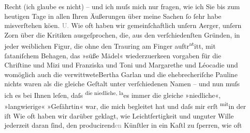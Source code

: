                Recht (ich glaube es nicht) – und ich muſs mich nur fragen, wie ich Sie bis zum
               heutigen Tage in allen Ihren Äußerungen über meine Sachen ſo ſehr habe misverſtehen
                  kö{\geminationn}en. \textcolor{gray}{U.} Wie oft haben wir
               gemeinſchaftlich unſern Aerger, unſern Zorn über die Kritiken ausgeſprochen, {\pb}die, aus den verſchiedenſten Gründen, in
               jeder weiblichen Figur, die ohne den Trauring am Finger auftr\substVorne{}\textsuperscript{at}\substDazwischen{}itt\substHinten{}, mit ſataniſchem Behagen, das »süße Mädel« wiederzuerke{\geminationn}en vorgaben {\dotsfour} für die Chriſtine und Mizi und Franziska und Toni und Margarethe und Léocadie und womöglich auch \introOben{}die verwittwete\introOben{}{ }Bertha Garlan und die
               ehebrecheriſche Pauline nichts
               waren als die gleiche Geſtalt unter verſchiedenen Na{\pb}men – und nun muſs ich es bei Ihnen \strikeout{\textcolor{gray}{wied}} leſen, daſs \substVorne{}\textsuperscript{die niedliche, la}\substDazwischen{}es\substHinten{} immer die gleiche »niedliche«, »langwierige« »Gefährtin« war, die mich
               begleitet hat und daſs  mir erſt \substVorne{}\textsuperscript{mit}\substDazwischen{}in\substHinten{} der \label{T_L02988-2v}\label{T_L02988-2} iſt{\dotstwo} Wie oft haben wir darüber geklagt, wie Leichtfertigkeit
               und unguter Wille jederzeit daran ſind, den producirend\textcolor{gray}{en}{ }{\pb}Künſtler in ein Kaſtl zu ſperren, wie oft
